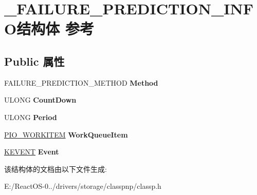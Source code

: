\hypertarget{struct___f_a_i_l_u_r_e___p_r_e_d_i_c_t_i_o_n___i_n_f_o}{}\section{\+\_\+\+F\+A\+I\+L\+U\+R\+E\+\_\+\+P\+R\+E\+D\+I\+C\+T\+I\+O\+N\+\_\+\+I\+N\+F\+O结构体 参考}
\label{struct___f_a_i_l_u_r_e___p_r_e_d_i_c_t_i_o_n___i_n_f_o}
\subsection*{Public 属性}
\begin{DoxyCompactItemize}
\item 
\mbox{\label{struct___f_a_i_l_u_r_e___p_r_e_d_i_c_t_i_o_n___i_n_f_o_a817d140c10afe919b21fd4c8ff597c31}} 
F\+A\+I\+L\+U\+R\+E\+\_\+\+P\+R\+E\+D\+I\+C\+T\+I\+O\+N\+\_\+\+M\+E\+T\+H\+OD {\bfseries Method}
\item 
\mbox{\label{struct___f_a_i_l_u_r_e___p_r_e_d_i_c_t_i_o_n___i_n_f_o_a52722b39e21f227f284e5d042b02f61c}} 
U\+L\+O\+NG {\bfseries Count\+Down}
\item 
\mbox{\label{struct___f_a_i_l_u_r_e___p_r_e_d_i_c_t_i_o_n___i_n_f_o_a64c5451a33166dabaa9038893dec47c6}} 
U\+L\+O\+NG {\bfseries Period}
\item 
\mbox{\label{struct___f_a_i_l_u_r_e___p_r_e_d_i_c_t_i_o_n___i_n_f_o_a7987ba16e2524755732932fd8f355ee5}} 
\hyperlink{struct___i_o___w_o_r_k_i_t_e_m}{P\+I\+O\+\_\+\+W\+O\+R\+K\+I\+T\+EM} {\bfseries Work\+Queue\+Item}
\item 
\mbox{\label{struct___f_a_i_l_u_r_e___p_r_e_d_i_c_t_i_o_n___i_n_f_o_a481baf41559c5060b506653a422d4f76}} 
\hyperlink{struct___k_e_v_e_n_t}{K\+E\+V\+E\+NT} {\bfseries Event}
\end{DoxyCompactItemize}


该结构体的文档由以下文件生成\+:\begin{DoxyCompactItemize}
\item 
E\+:/\+React\+O\+S-\/0../drivers/storage/classpnp/classp.\+h\end{DoxyCompactItemize}
